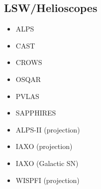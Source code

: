 \documentclass[8pt,twocolumn]{extarticle}
\begin{document}
\begin{mdframed}[everyline=true]
\begin{itemize}
\end{itemize}
\vspace{-2.5em}
\subsection*{LSW/Helioscopes}\vspace{-0.5em}
\begin{itemize}\setlength\itemsep{-0.5em}
    \item ALPS~\cite{Ehret:2010mh}
    \item CAST~\cite{CAST:2007jps,CAST:2017uph,CAST:2024eil}
    \item CROWS~\cite{Betz:2013dza}
    \item OSQAR~\cite{OSQAR:2015qdv}
    \item PVLAS~\cite{DellaValle:2015xxa}
    \item SAPPHIRES~\cite{SAPPHIRES:2021vkz,SAPPHIRES:2022bqg,Kirita:2024wti}
    \item ALPS-II (projection)~\cite{Ortiz:2020tgs}
    \item IAXO (projection)~\cite{IAXO:2019mpb}
    \item IAXO (Galactic SN)~\cite{Ge:2020zww}
    \item WISPFI (projection)~\cite{Batllori:2023pap}

\end{itemize}



\end{mdframed}
\end{document}
